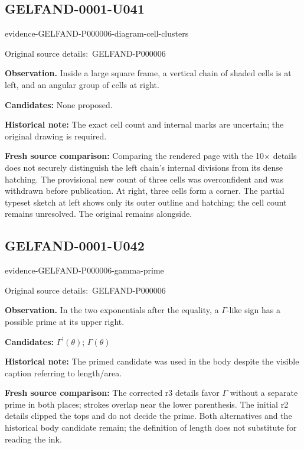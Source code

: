 \documentclass[11pt]{article}
\newcommand{\EvidenceBlock}[4]{%
 \par\smallskip\noindent\begin{minipage}{\linewidth}
 \begin{minipage}[t]{.47\linewidth}\vspace{0pt}\centering
 \csname evidence-#1-#2\endcsname\par
 {\scriptsize\SourceCropCaption\ #1}\par
 \end{minipage}\hfill
 \begin{minipage}[t]{.49\linewidth}\vspace{0pt}\raggedright
 {\small\color{orange!65!black}\textbf{#4} #3}\par
 \end{minipage}
 \end{minipage}\par\smallskip}
\newcommand{\SourceCropCaption}{Original source details:}\newcommand{\ReadingCaption}{Uncertain reading.}\newcommand{\IncompleteCaption}{Undeciphered passage.}\newcommand{\DiagramCaption}{Diagram and typed description.}
\begin{document}
\subsection*{GELFAND-0001-U041}
\EvidenceBlock{GELFAND-P000006}{diagram-cell-clusters}{Inside a large square frame, a vertical chain of shaded cells is at left, and an angular group of cells at right.}{Observation.}
\par\smallskip\noindent\textbf{Candidates: } None proposed.\par
\par\smallskip\noindent\textbf{Historical note: } The exact cell count and internal marks are uncertain; the original drawing is required.\par
\par\smallskip\noindent\textbf{Fresh source comparison: } Comparing the rendered page with the 10× details does not securely distinguish the left chain’s internal divisions from its dense hatching. The provisional new count of three cells was overconfident and was withdrawn before publication. At right, three cells form a corner. The partial typeset sketch at left shows only its outer outline and hatching; the cell count remains unresolved. The original remains alongside.\par

\subsection*{GELFAND-0001-U042}
\EvidenceBlock{GELFAND-P000006}{gamma-prime}{In the two exponentials after the equality, a \(\Gamma\)-like sign has a possible prime at its upper right.}{Observation.}
\par\smallskip\noindent\textbf{Candidates: } \(\Gamma^{\prime}(\theta)\); \(\Gamma(\theta)\)\par
\par\smallskip\noindent\textbf{Historical note: } The primed candidate was used in the body despite the visible caption referring to length/area.\par
\par\smallskip\noindent\textbf{Fresh source comparison: } The corrected r3 details favor \(\Gamma\) without a separate prime in both places; strokes overlap near the lower parenthesis. The initial r2 details clipped the tops and do not decide the prime. Both alternatives and the historical body candidate remain; the definition of length does not substitute for reading the ink.\par
\end{document}
